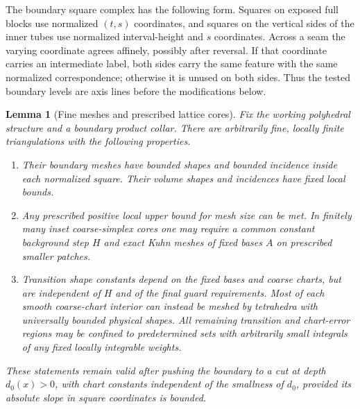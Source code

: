 \documentclass[11pt]{article}
\numberwithin{equation}{section}
\newtheorem{lemma}[theorem]{Lemma}
\theoremstyle{definition}
\theoremstyle{remark}
\begin{document}
The boundary square complex has the following form.  Squares on exposed
full blocks use normalized $(t,s)$ coordinates, and squares on the
vertical sides of the inner tubes use normalized interval-height and
$s$ coordinates.  Across a seam the varying coordinate agrees affinely,
possibly after reversal.  If that coordinate carries an intermediate
label, both sides carry the same feature with the same normalized
correspondence; otherwise it is unused on both sides.  Thus the tested
boundary levels are axis lines before the modifications below.

\begin{lemma}[Fine meshes and prescribed lattice cores]
\label{ms:meshes}
Fix the working polyhedral structure and a boundary product collar.
There are arbitrarily fine, locally finite triangulations with the
following properties.
\begin{enumerate}
\item Their boundary meshes have bounded shapes and bounded incidence
inside each normalized square.  Their volume shapes and incidences
have fixed local bounds.
\item Any prescribed positive local upper bound for mesh size can be
met.  In finitely many inset coarse-simplex cores one may require a
common constant background step $H$ and exact Kuhn meshes of fixed
bases $A$ on prescribed smaller patches.
\item Transition shape constants depend on the fixed bases and coarse
charts, but are independent of $H$ and of the final guard requirements.
Most of each smooth coarse-chart interior can instead be meshed by
tetrahedra with universally bounded physical shapes.  All remaining
transition and chart-error regions may be confined to predetermined
sets with arbitrarily small integrals of any fixed locally integrable
weights.
\end{enumerate}
These statements remain valid after pushing the boundary to a cut at
depth $d_0(x)>0$, with chart constants independent of the smallness of
$d_0$, provided its absolute slope in square coordinates is bounded.
\end{lemma}
\end{document}
